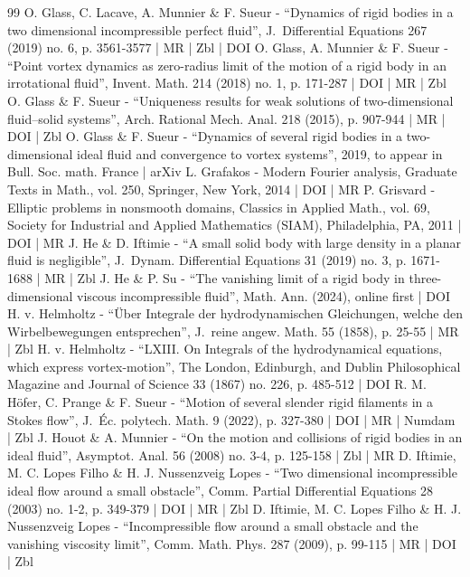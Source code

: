 \begin{thebibliography}{99}
O. Glass, C. Lacave, A. Munnier \& F. Sueur - “Dynamics of rigid bodies in a two dimensional incompressible perfect fluid”, J. Differential Equations 267 (2019) no. 6, p. 3561-3577 | MR | Zbl | DOI
O. Glass, A. Munnier \& F. Sueur - “Point vortex dynamics as zero-radius limit of the motion of a rigid body in an irrotational fluid”, Invent. Math. 214 (2018) no. 1, p. 171-287 | DOI | MR | Zbl
O. Glass \& F. Sueur - “Uniqueness results for weak solutions of two-dimensional fluid–solid systems”, Arch. Rational Mech. Anal. 218 (2015), p. 907-944 | MR | DOI | Zbl
O. Glass \& F. Sueur - “Dynamics of several rigid bodies in a two-dimensional ideal fluid and convergence to vortex systems”, 2019, to appear in Bull. Soc. math. France | arXiv
L. Grafakos - Modern Fourier analysis, Graduate Texts in Math., vol. 250, Springer, New York, 2014 | DOI | MR
P. Grisvard - Elliptic problems in nonsmooth domains, Classics in Applied Math., vol. 69, Society for Industrial and Applied Mathematics (SIAM), Philadelphia, PA, 2011 | DOI | MR
J. He \& D. Iftimie - “A small solid body with large density in a planar fluid is negligible”, J. Dynam. Differential Equations 31 (2019) no. 3, p. 1671-1688 | MR | Zbl
J. He \& P. Su - “The vanishing limit of a rigid body in three-dimensional viscous incompressible fluid”, Math. Ann. (2024), online first | DOI
H. v. Helmholtz - “Über Integrale der hydrodynamischen Gleichungen, welche den Wirbelbewegungen entsprechen”, J. reine angew. Math. 55 (1858), p. 25-55 | MR | Zbl
H. v. Helmholtz - “LXIII. On Integrals of the hydrodynamical equations, which express vortex-motion”, The London, Edinburgh, and Dublin Philosophical Magazine and Journal of Science 33 (1867) no. 226, p. 485-512 | DOI
R. M. Höfer, C. Prange \& F. Sueur - “Motion of several slender rigid filaments in a Stokes flow”, J. Éc. polytech. Math. 9 (2022), p. 327-380 | DOI | MR | Numdam | Zbl
J. Houot \& A. Munnier - “On the motion and collisions of rigid bodies in an ideal fluid”, Asymptot. Anal. 56 (2008) no. 3-4, p. 125-158 | Zbl | MR
D. Iftimie, M. C. Lopes Filho \& H. J. Nussenzveig Lopes - “Two dimensional incompressible ideal flow around a small obstacle”, Comm. Partial Differential Equations 28 (2003) no. 1-2, p. 349-379 | DOI | MR | Zbl
D. Iftimie, M. C. Lopes Filho \& H. J. Nussenzveig Lopes - “Incompressible flow around a small obstacle and the vanishing viscosity limit”, Comm. Math. Phys. 287 (2009), p. 99-115 | MR | DOI | Zbl

\end{thebibliography}
